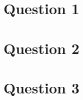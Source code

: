\documentclass{article}
\begin{document}
\part*{Question 1}

\part*{Question 2}

\part*{Question 3}

\end{document}
